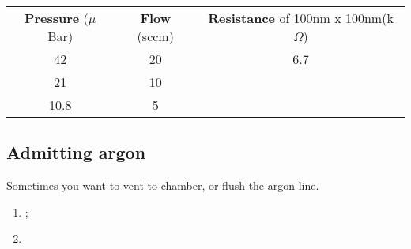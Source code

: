   \begin{table}
    \centering
    \begin{tabular}{c|c|c}
      \textbf{Pressure} ($\mu$Bar) & \textbf{Flow} (sccm) & \textbf{Resistance} of 100nm x 100nm(k$\Omega$)\\
      42 & 20 & 6.7\\
      21 & 10 & \\
      10.8 & 5 & \\
    \end{tabular}
  \end{table}

 \subsection{Admitting argon}
 Sometimes you want to vent to chamber, or flush the argon line.
 \begin{enumerate}
 \item {};
 \item {}
 \end{enumerate}


 \newpage
